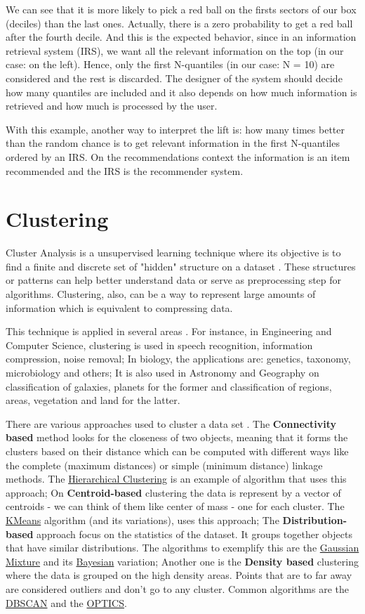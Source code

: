We can see that it is more likely to pick a red ball on the firsts sectors of our box (deciles) than the last ones. Actually, there is a zero probability to get a red ball after the fourth decile. And this is the expected behavior, since in an information retrieval system (IRS), we want all the relevant information on the top (in our case: on the left). Hence, only the first N-quantiles (in our case: N = 10) are considered and the rest is discarded. The designer of the system should decide how many quantiles are included and it also depends on how much information is retrieved and how much is processed by the user.

With this example, another way to interpret the lift is:  how many times better than the random chance is to get relevant information in the first N-quantiles ordered by an IRS. On the recommendations context the information is an item recommended and the IRS is the recommender system.

\section{Clustering}

Cluster Analysis is a unsupervised learning technique where its objective is to find a finite and discrete set of "hidden" structure on a dataset \cite{xu2008clustering}. These structures or patterns can help better understand data or serve as preprocessing step for algorithms. Clustering, also, can be a way to represent large amounts of information which is equivalent to compressing data. 

This technique is applied in several areas \cite{sabine2001cluster}. For instance, in Engineering and Computer Science, clustering is used in speech recognition, information compression, noise removal; In biology, the applications are: genetics, taxonomy, microbiology and others; It is also used in Astronomy and Geography on classification of galaxies, planets for the former and classification of regions, areas, vegetation and land for the latter.

There are various approaches used to cluster a data set \cite{wikipedia_cluster_analysis}. The \textbf{Connectivity based} method looks for the closeness of two objects, meaning that it forms the clusters based on their distance which can be computed with different ways like the complete (maximum distances) or simple (minimum distance) linkage methods. The \underline{Hierarchical Clustering} is an example of algorithm that uses this approach; On \textbf{Centroid-based} clustering the data is represent by a vector of centroids - we can think of them like center of mass - one for each cluster. The \underline{KMeans} algorithm (and its variations), uses this approach; The \textbf{Distribution-based} approach focus on the statistics of the dataset. It groups together objects that have similar distributions. The algorithms to exemplify this are the \underline{Gaussian Mixture} and its \underline{Bayesian} variation; Another one is the \textbf{Density based} clustering where the data is grouped on the high density areas. Points that are to far away are considered outliers and don't go to any cluster. Common algorithms are the \underline{DBSCAN} and the \underline{OPTICS}.


